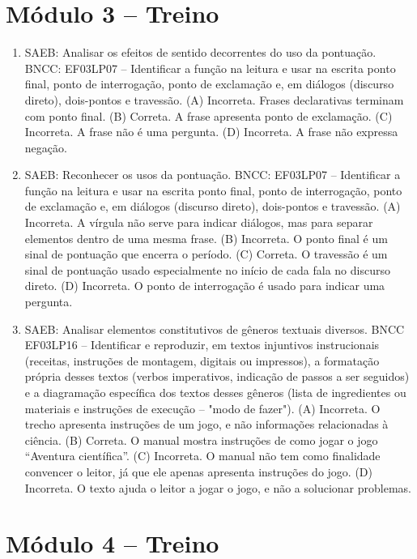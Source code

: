 \section*{Módulo 3 – Treino}

\begin{enumerate}
\item
SAEB: Analisar os efeitos de sentido decorrentes do uso da pontuação.
BNCC: EF03LP07 -- Identificar a função na leitura e usar na escrita ponto
final, ponto de interrogação, ponto de exclamação e, em diálogos
(discurso direto), dois-pontos e travessão.
(A) Incorreta. Frases declarativas terminam com ponto final.
(B) Correta. A frase apresenta ponto de exclamação.
(C) Incorreta. A frase não é uma pergunta.
(D) Incorreta. A frase não expressa negação.

\item
SAEB: Reconhecer os usos da pontuação.
BNCC: EF03LP07 -- Identificar a função na leitura e usar na escrita ponto
final, ponto de interrogação, ponto de exclamação e, em diálogos
(discurso direto), dois-pontos e travessão.
(A) Incorreta. A vírgula não serve para indicar diálogos, mas para
separar elementos dentro de uma mesma frase.
(B) Incorreta. O ponto final é um sinal de pontuação que encerra o
período.
(C) Correta. O travessão é um sinal de pontuação usado especialmente no
início de cada fala no discurso direto.
(D) Incorreta. O ponto de interrogação é usado para indicar uma
pergunta.

\item
SAEB: Analisar elementos constitutivos de gêneros textuais diversos.
BNCC EF03LP16 -- Identificar e reproduzir, em textos injuntivos
instrucionais (receitas, instruções de montagem, digitais ou impressos),
a formatação própria desses textos (verbos imperativos, indicação de
passos a ser seguidos) e a diagramação específica dos textos desses
gêneros (lista de ingredientes ou materiais e instruções de execução --
"modo de fazer").
(A) Incorreta. O trecho apresenta instruções de um jogo, e não
informações relacionadas à ciência.
(B) Correta. O manual mostra instruções de como jogar o jogo ``Aventura
científica''.
(C) Incorreta. O manual não tem como finalidade convencer o leitor, já
que ele apenas apresenta instruções do jogo.
(D) Incorreta. O texto ajuda o leitor a jogar o jogo, e não a solucionar
problemas.
\end{enumerate}

\section*{Módulo 4 – Treino}

